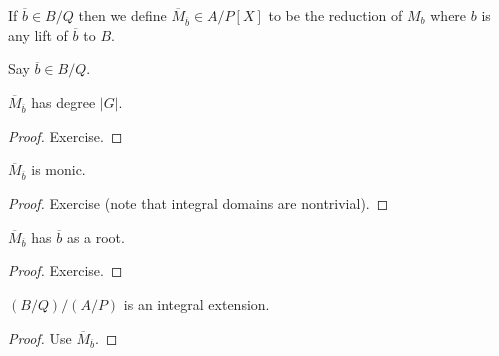 \begin{definition}
  \label{MulSemiringAction.CharacteristicPolynomial.Mbar}
  \leanok
  If $\overline{b}\in B/Q$ then we define $\overline{M}_{\overline{b}}\in A/P[X]$
  to be the reduction of $M_b$ where $b$ is any lift of $\overline{b}$ to $B$.
\end{definition}

Say $\overline{b}\in B/Q$.

\begin{theorem}
  \label{MulSemiringAction.CharacteristicPolynomial.Mbar_deg}
  \leanok
  $\overline{M}_{\overline{b}}$ has degree $|G|$.
\end{theorem}
\begin{proof}
  \leanok
  Exercise.
\end{proof}

\begin{theorem}
  \label{MulSemiringAction.CharacteristicPolynomial.Mbar_monic}
  \leanok
  $\overline{M}_{\overline{b}}$ is monic.
\end{theorem}
\begin{proof}
  \leanok
  Exercise (note that integral domains are nontrivial).
\end{proof}

\begin{theorem}
  \label{MulSemiringAction.CharacteristicPolynomial.Mbar_eval_eq_zero}
  \leanok
  $\overline{M}_{\overline{b}}$ has $\overline{b}$ as a root.
\end{theorem}
\begin{proof}
  \leanok
  Exercise.
\end{proof}

\begin{theorem}
  \label{MulSemiringAction.reduction_isIntegral}
  \leanok
  $(B/Q)/(A/P)$ is an integral extension.
\end{theorem}
\begin{proof}
  \leanok
  Use $\overline{M}_{\overline{b}}$.
\end{proof}

